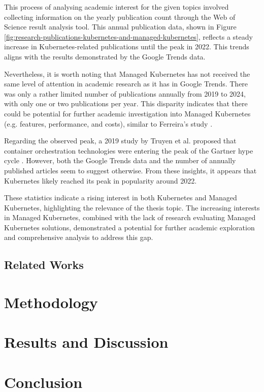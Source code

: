 This process of analysing academic interest for the given topics involved collecting information on the yearly publication count through the Web of Science result analysis tool. This annual publication data, shown in Figure \ref{fig:research-publications-kubernetes-and-managed-kubernetes}, reflects a steady increase in Kubernetes-related publications until the peak in 2022. This trends aligns with the results demonstrated by the Google Trends data.

Nevertheless, it is worth noting that Managed Kubernetes has not received the same level of attention in academic research as it has in Google Trends. There was only a rather limited number of publications annually from 2019 to 2024, with only one or two publications per year. This disparity indicates that there could be potential for further academic investigation into Managed Kubernetes (e.g. features, performance, and costs), similar to Ferreira’s study \cite{pereira_ferreira_performance_2019}.

Regarding the observed peak, a 2019 study by Truyen et al. proposed that container orchestration technologies were entering the peak of the Gartner hype cycle \cite{truyen_comprehensive_2019}. However, both the Google Trends data and the number of annually published articles seem to suggest otherwise. From these insights, it appears that Kubernetes likely reached its peak in popularity around 2022.

These statistics indicate a rising interest in both Kubernetes and Managed Kubernetes, highlighting the relevance of the thesis topic. The increasing interests in Managed Kubernetes, combined with the lack of research evaluating Managed Kubernetes solutions, demonstrated a potential for further academic exploration and comprehensive analysis to address this gap.

\section{Related Works}

\chapter{Methodology}


\chapter{Results and Discussion}


\chapter{Conclusion}

